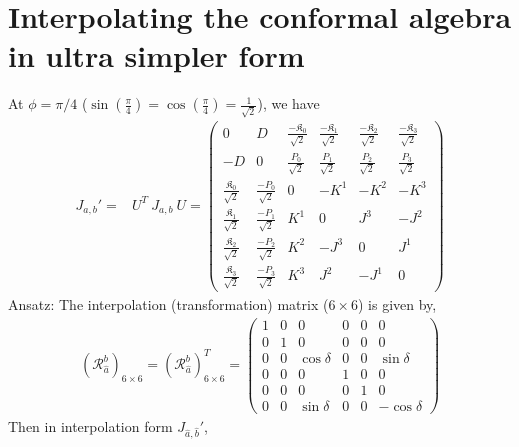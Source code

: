 \documentclass[]{article}
\numberwithin{equation}{section}
\begin{document}
{{\section{Interpolating the conformal algebra in ultra simpler form}
At $\phi=\pi/4$ ($\sin{(\frac{\pi}{4})}=\cos{(\frac{\pi}{4})}=\frac{1}{\sqrt{2}}$), we have
\begin{align}
    J_{a,b}'=&U^{T}~J_{a,b}~U=\begin{pmatrix}
  0&D&\frac{-\mathfrak{K}_0}{\sqrt{2}}&\frac{-\mathfrak{K}_1}{\sqrt{2}}&\frac{-\mathfrak{K}_2}{\sqrt{2}}&\frac{-\mathfrak{K}_3}{\sqrt{2}}\\
  -D&0&\frac{P_0}{\sqrt{2}}&\frac{P_1}{\sqrt{2}}&\frac{P_2}{\sqrt{2}}&\frac{P_3}{\sqrt{2}}\\
    \frac{\mathfrak{K}_0}{\sqrt{2}}&\frac{-P_0}{\sqrt{2}}&0 & -K^{1} & -K^{2} & -K^{3}\\
    \frac{\mathfrak{K}_1}{\sqrt{2}}&\frac{-P_1}{\sqrt{2}}&K^{1} & 0 & J^{3} & -J^{2}\\
    \frac{\mathfrak{K}_2}{\sqrt{2}}&\frac{-P_2}{\sqrt{2}}&K^{2} & -J^{3} & 0 & J^{1}\\
    \frac{\mathfrak{K}_3}{\sqrt{2}}&\frac{-P_3}{\sqrt{2}}&K^{3} & J^{2} & -J^{1} & 0
  \end{pmatrix}
\end{align}
Ansatz: The interpolation (transformation) matrix ($6\times6$) is given by,
\begin{align}
    (\mathcal{R}_{\hat{a}}^{b})_{6\times6}=(\mathcal{R}_{\hat{a}}^{b})^T_{6\times6}=\begin{pmatrix}
    1&0&0&0&0&0\\
    0&1&0&0&0&0\\
    0&0&\cos{\delta}&0&0&\sin{\delta}\\
    0&0&0&1&0&0\\
    0&0&0&0&1&0\\
    0&0&\sin{\delta}&0&0&-\cos{\delta}
    \end{pmatrix}
\end{align}
Then in interpolation form $J_{\hat{a},\hat{b}}'$,


}}
\end{document}
